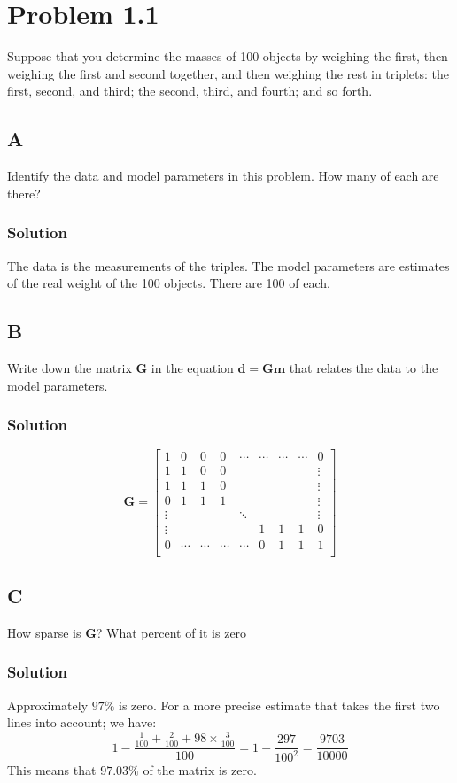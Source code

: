 \section*{Problem 1.1}
Suppose that you determine the masses of 100 objects by weighing the first, then weighing the first and second together, and then weighing the rest in triplets: the first, second, and third; the second, third, and fourth; and so forth.
\subsection*{A}
Identify the data and model parameters in this problem. How many of each are there?
\subsubsection*{Solution}
The data is the measurements of the triples. The model parameters are estimates of the real weight of the 100 objects. There are 100 of each.
\subsection*{B}
Write down the matrix $ \mathbf{G} $ in the equation $ \mathbf{d} = \mathbf{Gm}$ that relates the data to the model parameters.
\subsubsection*{Solution}
\begin{equation*}
\mathbf{G} = \begin{bmatrix}
1 & 0 & 0 & 0 & \cdots & \cdots & \cdots & \cdots & 0 \\
1 & 1 & 0 & 0 & & & & & \vdots \\
1 & 1 & 1 & 0 & & & & & \vdots \\
0 & 1 & 1 & 1 & & & & & \vdots \\
\vdots & & & & \ddots & & & & \vdots \\
\vdots & & & & & 1 & 1 & 1 & 0\\
0 & \cdots & \cdots & \cdots & \cdots & 0 & 1 & 1 & 1  \\
\end{bmatrix}
\end{equation*}
\subsection*{C}
How sparse is $ \mathbf{G} $? What percent of it is zero
\subsubsection*{Solution}
Approximately $97\%$ is zero. For a more precise estimate that takes the first two lines into account; we have:
\begin{equation*}
    1 - \frac{\frac{1}{100} + \frac{2}{100} + 98\times \frac{3}{100}}{100} = 1- \frac{297}{100^2} = \frac{9703}{10000}
\end{equation*}
This means that $97.03\%$ of the matrix is zero.
